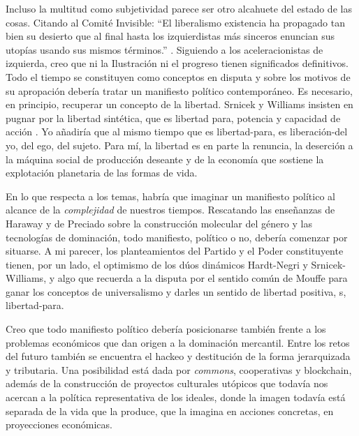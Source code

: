 Incluso la multitud como subjetividad parece ser otro alcahuete del estado de las cosas. Citando al Comité Invisible: \enquote{El liberalismo existencia ha propagado tan bien su desierto que al final hasta los izquierdistas más sinceros enuncian sus utopías usando sus mismos términos.} \autocite[p.~23]{LlamamientoOtrosFogonazos2009}. Siguiendo a los aceleracionistas de izquierda, creo que ni la Ilustración ni el progreso tienen significados definitivos. Todo el tiempo se constituyen como conceptos en disputa y sobre los motivos de su apropación debería tratar un manifiesto político contemporáneo. Es necesario, en principio, recuperar un concepto de la libertad. Srnicek y Williams insisten en pugnar por la libertad sintética, que es libertad para, potencia y capacidad de acción \autocite{srnicekInventarFuturoPoscapitalismo2017}. Yo añadiría que al mismo tiempo que es libertad-para, es liberación-del yo, del ego, del sujeto. Para mí, la libertad es en parte la renuncia, la deserción a la máquina social de producción deseante y de la economía que sostiene la explotación planetaria de las formas de vida.

En lo que respecta a los temas, habría que imaginar un manifiesto político al alcance de la \emph{complejidad} de nuestros tiempos. Rescatando las enseñanzas de Haraway y de Preciado sobre la construcción molecular del género y las tecnologías de dominación, todo manifiesto, político o no, debería comenzar por situarse. A mi parecer, los planteamientos del Partido y el Poder constituyente tienen, por un lado, el optimismo de los dúos dinámicos Hardt-Negri y Srnicek-Williams, y algo que recuerda a la disputa por el sentido común de Mouffe para ganar los conceptos de universalismo y darles un sentido de libertad positiva, s\autocite{srnicekInventarFuturoPoscapitalismo2017}, libertad-para.

Creo que todo manifiesto político debería posicionarse también frente a los problemas económicos que dan origen a la dominación mercantil. Entre los retos del futuro también se encuentra el hackeo y destitución de la forma jerarquizada y tributaria. Una posibilidad está dada por \emph{commons}, cooperativas y blockchain, además de la construcción de proyectos culturales utópicos que todavía nos acercan a la política representativa de los ideales, donde la imagen todavía está separada de la vida que la produce, que la imagina en acciones concretas, en proyecciones económicas.

